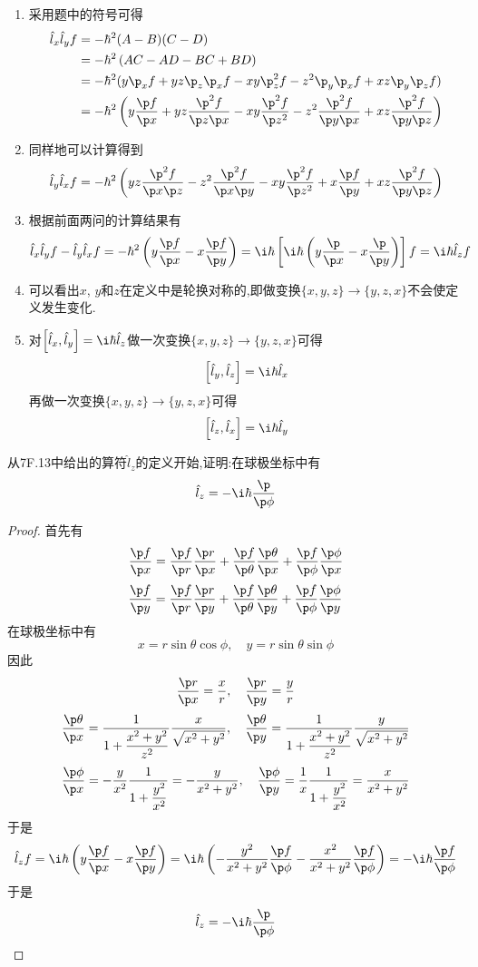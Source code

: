 \documentclass{ctexart}
\begin{document}
\begin{solution}
\begin{enumerate}[label=(\alph*)]
    \item 采用题中的符号可得
    \[\begin{aligned}
        \hat{l}_x\hat{l}_yf
        &=-\hbar^2(A-B)(C-D)\\
        &=-\hbar^2\left(AC-AD-BC+BD\right)\\
        &=-\hbar^2(y\p_xf+yz\p_z\p_xf-xy\p_z^2f-z^2\p_y\p_xf+xz\p_y\p_zf)\\
        &=-\hbar^2\left(y\dfrac{\p f}{\p x}+yz\dfrac{\p^2f}{\p z\p x}-xy\dfrac{\p^2f}{\p z^2}-z^2\dfrac{\p^2f}{\p y\p x}+xz\dfrac{\p^2f}{\p y\p z}\right)
    \end{aligned}\]
    \item 同样地可以计算得到
    \[\hat{l}_y\hat{l}_xf=-\hbar^2\left(yz\dfrac{\p^2f}{\p x\p z}-z^2\dfrac{\p^2f}{\p x\p y}-xy\dfrac{\p^2f}{\p z^2}+x\dfrac{\p f}{\p y}+xz\dfrac{\p^2f}{\p y\p z}\right)\]
    \item 根据前面两问的计算结果有
    \[\hat{l}_x\hat{l}_yf-\hat{l}_y\hat{l}_xf=-\hbar^2\left(y\dfrac{\p f}{\p x}-x\dfrac{\p f}{\p y}\right)=\i\hbar\left[\i\hbar\left(y\dfrac{\p}{\p x}-x\dfrac{\p}{\p y}\right)\right]f=\i\hbar\hat{l}_zf\]
    \item 可以看出$x$, $y$和$z$在定义中是轮换对称的,即做变换$\{x,y,z\}\to\{y,z,x\}$不会使定义发生变化.
    \item 对$\left[\hat{l}_x,\hat{l}_y\right]=\i\hbar\hat{l}_z$做一次变换$\{x,y,z\}\to\{y,z,x\}$可得
    \[\left[\hat{l}_y,\hat{l}_z\right]=\i\hbar\hat{l}_x\]
    再做一次变换$\{x,y,z\}\to\{y,z,x\}$可得
    \[\left[\hat{l}_z,\hat{l}_x\right]=\i\hbar\hat{l}_y\]
\end{enumerate}
\end{solution}
\begin{homework}[20.]
    从7F.13中给出的算符$\hat{l}_z$的定义开始,证明:在球极坐标中有
    \[\hat{l}_z=-\i\hbar\dfrac{\p}{\p\phi}\]
\end{homework}
\begin{proof}
    首先有
    \[\dfrac{\p f}{\p x}=\dfrac{\p f}{\p r}\dfrac{\p r}{\p x}+\dfrac{\p f}{\p\theta}\dfrac{\p\theta}{\p x}+\dfrac{\p f}{\p\phi}\dfrac{\p\phi}{\p x}\]
    \[\dfrac{\p f}{\p y}=\dfrac{\p f}{\p r}\dfrac{\p r}{\p y}+\dfrac{\p f}{\p\theta}\dfrac{\p\theta}{\p y}+\dfrac{\p f}{\p\phi}\dfrac{\p\phi}{\p y}\]
    在球极坐标中有
    \[x=r\sin\theta\cos\phi,\quad y=r\sin\theta\sin\phi\]
    因此
    \[\dfrac{\p r}{\p x}=\dfrac{x}{r},\quad\dfrac{\p r}{\p y}=\dfrac{y}{r}\]
    \[\dfrac{\p\theta}{\p x}=\dfrac{1}{1+\dfrac{x^2+y^2}{z^2}}\dfrac{x}{\sqrt{x^2+y^2}},\quad\dfrac{\p\theta}{\p y}=\dfrac{1}{1+\dfrac{x^2+y^2}{z^2}}\dfrac{y}{\sqrt{x^2+y^2}}\]
    \[\dfrac{\p\phi}{\p x}=-\dfrac{y}{x^2}\dfrac{1}{1+\dfrac{y^2}{x^2}}=-\dfrac{y}{x^2+y^2},\quad\dfrac{\p\phi}{\p y}=\dfrac{1}{x}\dfrac{1}{1+\dfrac{y^2}{x^2}}=\dfrac{x}{x^2+y^2}\]
    于是
    \[\hat{l}_zf=\i\hbar\left(y\dfrac{\p f}{\p x}-x\dfrac{\p f}{\p y}\right)=\i\hbar\left(-\dfrac{y^2}{x^2+y^2}\dfrac{\p f}{\p\phi}-\dfrac{x^2}{x^2+y^2}\dfrac{\p f}{\p\phi}\right)=-\i\hbar\dfrac{\p f}{\p\phi}\]
    于是
    \[\hat{l}_z=-\i\hbar\dfrac{\p}{\p\phi}\]
\end{proof}
\end{document}
